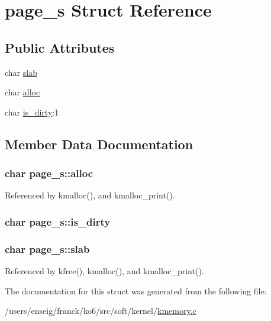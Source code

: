 \hypertarget{structpage__s}{\section{page\-\_\-s Struct Reference}
\label{structpage__s}
}
\subsection*{Public Attributes}
\begin{DoxyCompactItemize}
\item 
char \hyperlink{structpage__s_a32a24096972b27d87a55051df616ae99}{slab}
\item 
char \hyperlink{structpage__s_a1b4a61989804f75b7d857636e35c9c2f}{alloc}
\item 
char \hyperlink{structpage__s_ae281f75fa7844e705c1fa5dfcff0d6ae}{is\-\_\-dirty}\-:1
\end{DoxyCompactItemize}


\subsection{Member Data Documentation}
\hypertarget{structpage__s_a1b4a61989804f75b7d857636e35c9c2f}{
\subsubsection[{alloc}]{\setlength{\rightskip}{0pt plus 5cm}char page\-\_\-s\-::alloc}}\label{structpage__s_a1b4a61989804f75b7d857636e35c9c2f}


Referenced by kmalloc(), and kmalloc\-\_\-print().

\hypertarget{structpage__s_ae281f75fa7844e705c1fa5dfcff0d6ae}{
\subsubsection[{is\-\_\-dirty}]{\setlength{\rightskip}{0pt plus 5cm}char page\-\_\-s\-::is\-\_\-dirty}}\label{structpage__s_ae281f75fa7844e705c1fa5dfcff0d6ae}
\hypertarget{structpage__s_a32a24096972b27d87a55051df616ae99}{
\subsubsection[{slab}]{\setlength{\rightskip}{0pt plus 5cm}char page\-\_\-s\-::slab}}\label{structpage__s_a32a24096972b27d87a55051df616ae99}


Referenced by kfree(), kmalloc(), and kmalloc\-\_\-print().



The documentation for this struct was generated from the following file\-:\begin{DoxyCompactItemize}
\item 
/users/enseig/franck/ko6/src/soft/kernel/\hyperlink{kmemory_8c}{kmemory.\-c}\end{DoxyCompactItemize}
